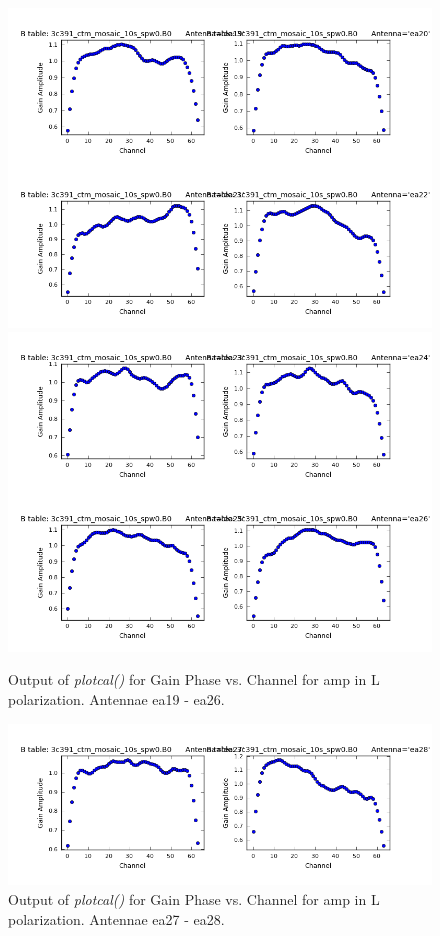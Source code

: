 \documentclass[12pt, a4paper]{article}
\begin{document}
\begin{figure}[h!]
\centering
\includegraphics[scale=0.65]{../Imaging/plots2/part4-subE-question3a_amp_pol-L-ea19-ea22.png}
\includegraphics[scale=0.65]{../Imaging/plots2/part4-subE-question3a_amp_pol-L-ea23-ea26.png}
\caption{Output of \emph{plotcal()} for Gain Phase vs. Channel for amp in L polarization. Antennae ea19 - ea26.}
\end{figure}
\addtocounter{figure}{-1}

\begin{figure}[h!]
\centering
\includegraphics[scale=0.65]{../Imaging/plots2/part4-subE-question3a_amp_pol-L-ea27-ea28.png}
\caption{Output of \emph{plotcal()} for Gain Phase vs. Channel for amp in L polarization. Antennae ea27 - ea28. \label{fig:part4subE-q3a-amp-L}}
\end{figure}
\end{document}
